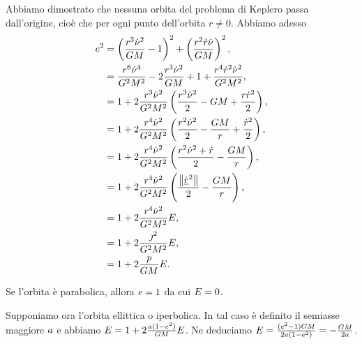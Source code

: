 \par Abbiamo dimostrato che nessuna orbita del problema di Keplero passa dall'origine, cio\`e che per ogni punto dell'orbita $r \neq 0$. Abbiamo adesso
\begin{align*}
	\LenzVector^2
	&= \left ( \frac{r^3\dot{\TrueAnomaly}^2}{\NewtonConstant\TotalMass} - 1 \right )^2 + \left ( \frac{r^2\dot{r}\dot{\TrueAnomaly}}{\NewtonConstant\TotalMass} \right )^2,\\
	&= \frac{r^6\dot{\TrueAnomaly}^4}{\NewtonConstant^2\TotalMass^2} - 2 \frac{r^3\dot{\TrueAnomaly}^2}{\NewtonConstant\TotalMass} + 1 + \frac{r^4\dot{r}^2\dot{\TrueAnomaly}^2}{\NewtonConstant^2\TotalMass^2},\\
	&= 1 + 2 \frac{r^3\dot{\TrueAnomaly}^2}{\NewtonConstant^2\TotalMass^2} \left (\frac{r^3\dot{\TrueAnomaly}^2}{2} - \NewtonConstant\TotalMass + \frac{r\dot{r}^2}{2} \right ),\\
	&= 1 + 2 \frac{r^4\dot{\TrueAnomaly}^2}{\NewtonConstant^2\TotalMass^2} \left (\frac{r^2\dot{\TrueAnomaly}^2}{2} - \frac{\NewtonConstant\TotalMass}{r} + \frac{\dot{r}^2}{2} \right ),\\
	&= 1 + 2 \frac{r^4\dot{\TrueAnomaly}^2}{\NewtonConstant^2\TotalMass^2} \left (\frac{r^2\dot{\TrueAnomaly}^2 + \dot{r}}{2} - \frac{\NewtonConstant\TotalMass}{r} \right ),\\
	&= 1 + 2 \frac{r^4\dot{\TrueAnomaly}^2}{\NewtonConstant^2\TotalMass^2} \left (\frac{\Norm{\dot{\vec{r}}^2}}{2} - \frac{\NewtonConstant\TotalMass}{r} \right ),\\
	&= 1 + 2 \frac{r^4\dot{\TrueAnomaly}^2}{\NewtonConstant^2\TotalMass^2} \EnergyPerUnitMass,\\
	&= 1 + 2 \frac{\AngularMomentPerUnitMass^2}{\NewtonConstant^2\TotalMass^2} \EnergyPerUnitMass,\\
	&= 1 + 2 \frac{\SemilatusRectum}{\NewtonConstant\TotalMass} \EnergyPerUnitMass.
\end{align*}
\par Se l'orbita \`e parabolica, allora $e = 1$ da cui $E = 0$.
\par Supponiamo ora l'orbita ellittica o iperbolica. In tal caso \`e definito il semiasse maggiore $a$ e abbiamo $E = 1 + 2 \frac{a (1 - e^2)}{GM} E$. Ne deduciamo $E = \frac{(e^2 - 1)GM}{2a(1 - e^2)} = - \frac{GM}{2a}$. \EndProof
